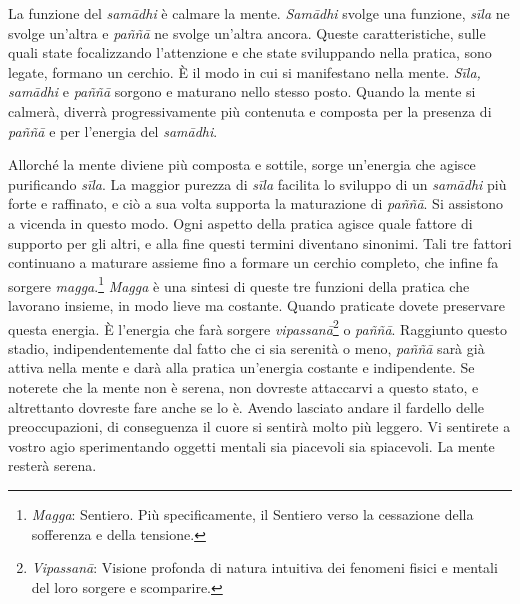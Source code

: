 La funzione del \emph{samādhi} è calmare la mente. \emph{Samādhi} svolge
una funzione, \emph{sīla} ne svolge un'altra e \emph{paññā} ne svolge
un'altra ancora. Queste caratteristiche, sulle quali state focalizzando
l'attenzione e che state sviluppando nella pratica, sono legate, formano
un cerchio. È il modo in cui si manifestano nella mente. \emph{Sīla,}
\emph{samādhi} e \emph{paññā} sorgono e maturano nello stesso posto.
Quando la mente si calmerà, diverrà progressivamente più contenuta e
composta per la presenza di \emph{paññā} e per l'energia del
\emph{samādhi}.

Allorché la mente diviene più composta e sottile, sorge un'energia che
agisce purificando \emph{sīla}. La maggior purezza di \emph{sīla}
facilita lo sviluppo di un \emph{samādhi} più forte e raffinato, e ciò a
sua volta supporta la maturazione di \emph{paññā}. Si assistono a
vicenda in questo modo. Ogni aspetto della pratica agisce quale fattore
di supporto per gli altri, e alla fine questi termini diventano
sinonimi. Tali tre fattori continuano a maturare assieme fino a formare
un cerchio completo, che infine fa sorgere \emph{magga}.\footnote{%
  \emph{Magga}:
  Sentiero. Più specificamente, il Sentiero verso la cessazione della
  sofferenza e della tensione.} \emph{Magga} è una sintesi di queste tre
funzioni della pratica che lavorano insieme, in modo lieve ma costante.
Quando praticate dovete preservare questa energia. È l'energia che farà
sorgere \emph{vipassanā}\footnote{\emph{Vipassanā}: Visione profonda di
  natura intuitiva dei fenomeni fisici e mentali del loro sorgere e
  scomparire.} o \emph{paññā}. Raggiunto questo stadio,
indipendentemente dal fatto che ci sia serenità o meno, \emph{paññā}
sarà già attiva nella mente e darà alla pratica un'energia costante e
indipendente. Se noterete che la mente non è serena, non dovreste
attaccarvi a questo stato, e altrettanto dovreste fare anche se lo è.
Avendo lasciato andare il fardello delle preoccupazioni, di conseguenza
il cuore si sentirà molto più leggero. Vi sentirete a vostro agio
sperimentando oggetti mentali sia piacevoli sia spiacevoli. La mente
resterà serena.

